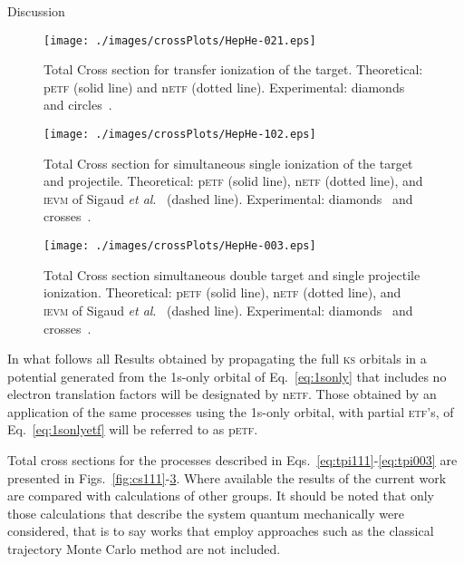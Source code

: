 \documentclass[aps, pra, reprint, groupedaddress, amsfonts,
               amsmath, amssymb, showpacs, nofootinbib]{revtex4-1}
\begin{document}
\begin{section}{Discussion \label{sec:disc}}
   \begin{figure}[t]
      \centering
      \texttt{[image: ./images/crossPlots/HepHe-021.eps]}
      \caption{Total Cross section for transfer ionization of the target.
               Theoretical: p\textsc{etf} (solid line) and n\textsc{etf} (dotted line).
               Experimental: diamonds~\cite{Dub-89} and circles~\cite{FTFHLP-95}. \label{fig:cs021}}
   \end{figure}
   \begin{figure}[t]
      \centering
      \texttt{[image: ./images/crossPlots/HepHe-102.eps]}
      \caption{Total Cross section for simultaneous single ionization of the target and projectile.
               Theoretical: p\textsc{etf} (solid line), n\textsc{etf} (dotted line), and
                            \textsc{ievm} of Sigaud \textit{et al}.~\cite{SM-03} (dashed line).
               Experimental: diamonds~\cite{Dub-89} and crosses~\cite{SSMSM-11}. \label{fig:cs102}}
   \end{figure}

   \begin{figure}[t]
      \centering
      \texttt{[image: ./images/crossPlots/HepHe-003.eps]}
      \caption{Total Cross section simultaneous double target and single projectile ionization.
               Theoretical: p\textsc{etf} (solid line), n\textsc{etf} (dotted line), and
               \textsc{ievm} of Sigaud \textit{et al}.~\cite{SM-03} (dashed line).
               Experimental: diamonds~\cite{Dub-89} and crosses~\cite{SSMSM-11}. \label{fig:cs003}}
   \end{figure}


   In what follows all Results obtained by propagating the full \textsc{ks} orbitals in a potential
   generated from the 1s-only orbital of Eq.~\eqref{eq:1sonly} that includes no electron translation
   factors will be designated by n\textsc{etf}. Those obtained by an application of the same processes
   using the 1s-only orbital, with partial \textsc{etf}'s, of Eq.~\eqref{eq:1sonlyetf} will be referred
   to as p\textsc{etf}.
   
   Total cross sections for the processes described in
   Eqs.~\eqref{eq:tpi111}-\eqref{eq:tpi003} are presented in Figs.~\ref{fig:cs111}-\ref{fig:cs003}.
   Where available the results of the current work are compared with calculations of other groups. It
   should be noted that only those calculations that describe the system quantum mechanically were
   considered, that is to say works that employ approaches such as the classical trajectory Monte Carlo
   method are not included.


\end{section}
\end{document}
